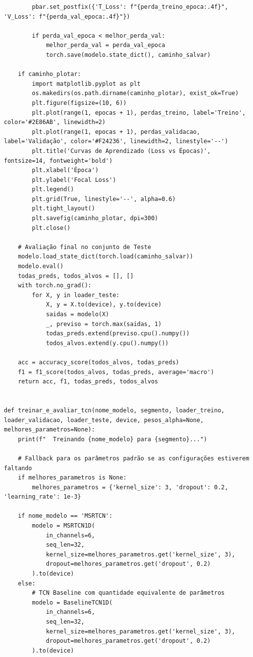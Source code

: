 \documentclass{article}
\begin{document}
\begin{verbatim}
        pbar.set_postfix({'T_Loss': f"{perda_treino_epoca:.4f}", 'V_Loss': f"{perda_val_epoca:.4f}"})
        
        if perda_val_epoca < melhor_perda_val:
            melhor_perda_val = perda_val_epoca
            torch.save(modelo.state_dict(), caminho_salvar)
            
    if caminho_plotar:
        import matplotlib.pyplot as plt
        os.makedirs(os.path.dirname(caminho_plotar), exist_ok=True)
        plt.figure(figsize=(10, 6))
        plt.plot(range(1, epocas + 1), perdas_treino, label='Treino', color='#2E86AB', linewidth=2)
        plt.plot(range(1, epocas + 1), perdas_validacao, label='Validação', color='#F24236', linewidth=2, linestyle='--')
        plt.title('Curvas de Aprendizado (Loss vs Épocas)', fontsize=14, fontweight='bold')
        plt.xlabel('Época')
        plt.ylabel('Focal Loss')
        plt.legend()
        plt.grid(True, linestyle='--', alpha=0.6)
        plt.tight_layout()
        plt.savefig(caminho_plotar, dpi=300)
        plt.close()
            
    # Avaliação final no conjunto de Teste
    modelo.load_state_dict(torch.load(caminho_salvar))
    modelo.eval()
    todas_preds, todos_alvos = [], []
    with torch.no_grad():
        for X, y in loader_teste:
            X, y = X.to(device), y.to(device)
            saidas = modelo(X)
            _, previso = torch.max(saidas, 1)
            todas_preds.extend(previso.cpu().numpy())
            todos_alvos.extend(y.cpu().numpy())
            
    acc = accuracy_score(todos_alvos, todas_preds)
    f1 = f1_score(todos_alvos, todas_preds, average='macro')
    return acc, f1, todas_preds, todos_alvos


def treinar_e_avaliar_tcn(nome_modelo, segmento, loader_treino, loader_validacao, loader_teste, device, pesos_alpha=None, melhores_parametros=None):
    print(f"  Treinando {nome_modelo} para {segmento}...")
    
    # Fallback para os parâmetros padrão se as configurações estiverem faltando
    if melhores_parametros is None:
        melhores_parametros = {'kernel_size': 3, 'dropout': 0.2, 'learning_rate': 1e-3}
        
    if nome_modelo == 'MSRTCN':
        modelo = MSRTCN1D(
            in_channels=6, 
            seq_len=32,
            kernel_size=melhores_parametros.get('kernel_size', 3),
            dropout=melhores_parametros.get('dropout', 0.2)
        ).to(device)
    else:
        # TCN Baseline com quantidade equivalente de parâmetros
        modelo = BaselineTCN1D(
            in_channels=6,
            seq_len=32,
            kernel_size=melhores_parametros.get('kernel_size', 3),
            dropout=melhores_parametros.get('dropout', 0.2)
        ).to(device)
    

\end{verbatim}
\end{document}
